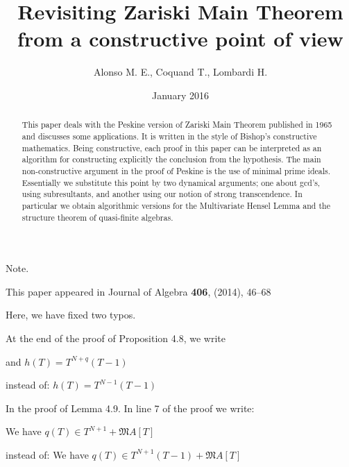 \documentclass[11pt,a4paper,twoside]{article}
\newcommand{\gothic}{\mathfrak}
\newcommand{\fM}{{\gothic M}}
\begin{document}




\title{Revisiting Zariski Main Theorem from a constructive point of view}

\author{Alonso M. E., Coquand T., Lombardi H.}
\date{January 2016}


\maketitle

\noindent Note.

\noindent  
This paper appeared in Journal of Algebra {\bf 406}, (2014), 46--68

\smallskip\noindent  Here, we have fixed two typos.

\smallskip \noindent At the end of the proof of Proposition 4.8, we  write

\hspace{1em}and $h(T)=T^{N+q}(T-1)$

\noindent instead of:  $h(T)=T^{N-1}(T-1)$

\smallskip \noindent In the proof of Lemma 4.9. 
In line 7 of the proof we write: 

\hspace{1em}We have $q(T)\in T^{N+1}+\fM A[T]$

\noindent instead of:  We have $q(T)\in T^{N+1}(T-1)+\fM A[T]$


\newcommand\hum[1]{}
%

\begin{abstract}
This paper deals with the Peskine version of Zariski Main Theorem published in 1965  and discusses some applications. 
It is written in the style of Bishop's constructive mathematics. Being constructive, each proof in this paper can be interpreted as
an algorithm for constructing explicitly the conclusion from the hypothesis.
The main non-constructive argument in the proof of Peskine is the use of minimal prime ideals.  Essentially we substitute this point by two dynamical arguments; one about 
 gcd's, using  {subresultants}, and another
 using our  notion of  {strong transcendence}.   
In particular we obtain algorithmic versions for the Multivariate Hensel Lemma
and the structure theorem of quasi-finite algebras.
\end{abstract}
\end{document}
